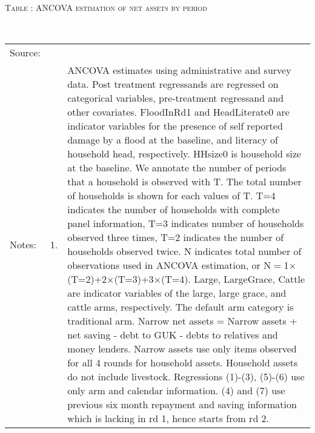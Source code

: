 \hspace{-1cm}\begin{minipage}[t]{14cm} \hfil\textsc{\normalsize Table \thetable: ANCOVA estimation of net assets by period\label{tab ANCOVA narrow net assets timevarying}}\\ \setlength{\tabcolsep}{1pt}
  \setlength{\baselineskip}{8pt}
  \renewcommand{\arraystretch}{.55}
  \hfil{}\\
\renewcommand{\arraystretch}{.8}
\setlength{\tabcolsep}{1pt} \begin{tabular}{>{\hfill\scriptsize}p{1cm}<{}>{\hfill\scriptsize}p{.25cm}<{}>{\scriptsize}p{12cm}<{\hfill}} 
Source:& \multicolumn{2}{l}{\scriptsize Estimated with GUK administrative and survey data.}\\
Notes: & 1. & ANCOVA estimates using administrative and survey data. Post treatment regressands are regressed on categorical variables, pre-treatment regressand and other covariates. \textsf{FloodInRd1} and \textsf{HeadLiterate0} are indicator variables for the presence of self reported damage by a flood at the baseline, and literacy of household head, respectively. \textsf{HHsize0} is household size at the baseline. We annotate the number of periods that a household is observed with \textsf{T}. The total number of households is shown for each values of \textsf{T}. \textsf{T=4} indicates the number of households with complete panel information, \textsf{T=3} indicates number of households observed three times, \textsf{T=2} indicates the number of households observed twice. \textsf{N} indicates total number of observations used in ANCOVA estimation, or \textsf{N$=$1$\times$(T=2)+2$\times$(T=3)+3$\times$(T=4)}.  \textsf{Large}, \textsf{LargeGrace}, \textsf{Cattle} are indicator variables of the \textsf{large}, \textsf{large grace}, and \textsf{cattle} arms, respectively. The default arm category is \textsf{traditional} arm. Narrow net assets = Narrow assets + net saving - debt to GUK - debts to relatives and money lenders. Narrow assets use only items observed for all 4 rounds for household assets. Household assets do not include livestock. Regressions (1)-(3), (5)-(6) use only arm and calendar information. (4) and (7) use previous six month repayment and saving information which is lacking in rd 1, hence starts from rd 2.\\

\end{tabular}
\end{minipage}
